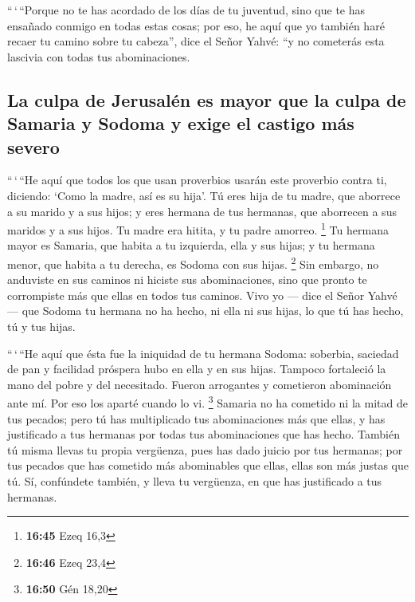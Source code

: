 \begin{paracol}{2}
 ``\,`\,``Porque no te has acordado de los días de tu
juventud, sino que te has ensañado conmigo en todas estas cosas; por
eso, he aquí que yo también haré recaer tu camino sobre tu cabeza'',
dice el Señor Yahvé: ``y no cometerás esta lascivia con todas tus
abominaciones.

\hypertarget{la-culpa-de-jerusaluxe9n-es-mayor-que-la-culpa-de-samaria-y-sodoma-y-exige-el-castigo-muxe1s-severo}{%
\subsection{La culpa de Jerusalén es mayor que la culpa de Samaria y
Sodoma y exige el castigo más
severo}\label{la-culpa-de-jerusaluxe9n-es-mayor-que-la-culpa-de-samaria-y-sodoma-y-exige-el-castigo-muxe1s-severo}}

 ``\,`\,``He aquí que todos los que usan proverbios
usarán este proverbio contra ti, diciendo: `Como la madre, así es su
hija'.  Tú eres hija de tu madre, que aborrece a su
marido y a sus hijos; y eres hermana de tus hermanas, que aborrecen a
sus maridos y a sus hijos. Tu madre era hitita, y tu padre amorreo.
\footnote{\textbf{16:45} Ezeq 16,3}  Tu hermana mayor es
Samaria, que habita a tu izquierda, ella y sus hijas; y tu hermana
menor, que habita a tu derecha, es Sodoma con sus hijas. \footnote{\textbf{16:46}
  Ezeq 23,4}  Sin embargo, no anduviste en sus caminos ni
hiciste sus abominaciones, sino que pronto te corrompiste más que ellas
en todos tus caminos.  Vivo yo --- dice el Señor Yahvé
--- que Sodoma tu hermana no ha hecho, ni ella ni sus hijas, lo que tú
has hecho, tú y tus hijas.

 ``\,`\,``He aquí que ésta fue la iniquidad de tu hermana
Sodoma: soberbia, saciedad de pan y facilidad próspera hubo en ella y en
sus hijas. Tampoco fortaleció la mano del pobre y del necesitado.
 Fueron arrogantes y cometieron abominación ante mí. Por
eso los aparté cuando lo vi. \footnote{\textbf{16:50} Gén 18,20}
 Samaria no ha cometido ni la mitad de tus pecados; pero
tú has multiplicado tus abominaciones más que ellas, y has justificado a
tus hermanas por todas tus abominaciones que has hecho. 
También tú misma llevas tu propia vergüenza, pues has dado juicio por
tus hermanas; por tus pecados que has cometido más abominables que
ellas, ellas son más justas que tú. Sí, confúndete también, y lleva tu
vergüenza, en que has justificado a tus hermanas.


\end{paracol}
